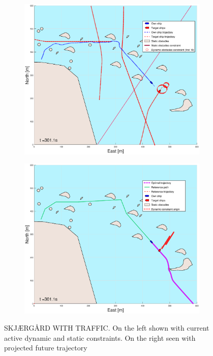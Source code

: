 \begin{figure}[ht]
\begin{subfigure}[b]{0.499\textwidth}
    \end{subfigure}
    \hfill
    \\
    \begin{subfigure}[b]{0.49\textwidth}
        \centering
        \includegraphics[width=\textwidth]{Images/Figures/skjergard_m_trafikk_NEW/_Simple_1fig1_time=301}
    \end{subfigure}
    \hfill
    \begin{subfigure}[b]{0.499\textwidth}
        \centering
        \includegraphics[width=\textwidth]{Images/Figures/skjergard_m_trafikk_NEW/_Simple_1fig999_time=301}
    \end{subfigure}
    \hfill
    \caption{SKJÆRGÅRD WITH TRAFFIC. On the left shown with current active dynamic and static constraints. On the right seen with projected future trajectory}
\end{figure}



